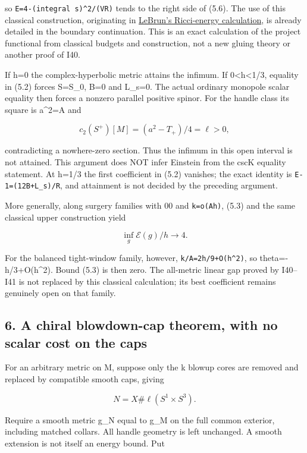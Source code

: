 \documentclass[
  10pt,
]{article}
\begin{document}
so \texttt{E=4-(integral\ s)\^{}2/(VR)} tends to the right side of
(5.6). The use of this classical construction, originating in
\href{https://arxiv.org/abs/math/0003068}{LeBrun's Ricci-energy
calculation}, is already detailed in the boundary continuation. This is
an exact calculation of the project functional from classical budgets
and construction, not a new gluing theory or another proof of I40.

If h=0 the complex-hyperbolic metric attains the infimum. If
0\textless h\textless1/3, equality in (5.2) forces S=S\_0, B=0 and
L\_s=0. The actual ordinary monopole scalar equality then forces a
nonzero parallel positive spinor. For the handle class its square is
a\^{}2=A and

\[
                         c_2(S^+)[M]=(a^2-T_+)/4=\ell>0,
\]

contradicting a nowhere-zero section. Thus the infimum in this open
interval is not attained. This argument does NOT infer Einstein from the
cscK equality statement. At h=1/3 the first coefficient in (5.2)
vanishes; the exact identity is \texttt{E-1=(12B+L\_s)/R}, and
attainment is not decided by the preceding argument.

More generally, along surgery families with 00 and \texttt{k=o(Ah)},
(5.3) and the same classical upper construction yield

\[
                         \inf_g\mathcal E(g)/h\longrightarrow4. \tag{5.7}
\]

For the balanced tight-window family, however,
\texttt{k/A=2h/9+O(h\^{}2)}, so theta=-h/3+O(h\^{}2). Bound (5.3) is
then zero. The all-metric linear gap proved by I40--I41 is not replaced
by this classical calculation; its best coefficient remains genuinely
open on that family.

\hypertarget{a-chiral-blowdown-cap-theorem-with-no-scalar-cost-on-the-caps}{%
\subsection{6. A chiral blowdown-cap theorem, with no scalar cost on the
caps}\label{a-chiral-blowdown-cap-theorem-with-no-scalar-cost-on-the-caps}}

For an arbitrary metric on M, suppose only the k blowup cores are
removed and replaced by compatible smooth caps, giving

\[
                         N=X\#\ell(S^1\times S^3).
\]

Require a smooth metric g\_N equal to g\_M on the full common exterior,
including matched collars. All handle geometry is left unchanged. A
smooth extension is not itself an energy bound. Put
\end{document}
